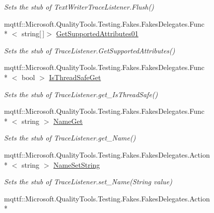 \begin{DoxyCompactItemize}
\begin{DoxyCompactList}\small\item\em Sets the stub of Text\-Writer\-Trace\-Listener.\-Flush()\end{DoxyCompactList}\item 
mqttf\-::\-Microsoft.\-Quality\-Tools.\-Testing.\-Fakes.\-Fakes\-Delegates.\-Func\\*
$<$ string\mbox{[}$\,$\mbox{]}$>$ \hyperlink{class_system_1_1_diagnostics_1_1_fakes_1_1_stub_xml_writer_trace_listener_a46c2a38f8b5dca50710cf2c2ad07886a}{Get\-Supported\-Attributes01}
\begin{DoxyCompactList}\small\item\em Sets the stub of Trace\-Listener.\-Get\-Supported\-Attributes()\end{DoxyCompactList}\item 
mqttf\-::\-Microsoft.\-Quality\-Tools.\-Testing.\-Fakes.\-Fakes\-Delegates.\-Func\\*
$<$ bool $>$ \hyperlink{class_system_1_1_diagnostics_1_1_fakes_1_1_stub_xml_writer_trace_listener_ae53f7ba7d41121ea3fb05afdf7184161}{Is\-Thread\-Safe\-Get}
\begin{DoxyCompactList}\small\item\em Sets the stub of Trace\-Listener.\-get\-\_\-\-Is\-Thread\-Safe()\end{DoxyCompactList}\item 
mqttf\-::\-Microsoft.\-Quality\-Tools.\-Testing.\-Fakes.\-Fakes\-Delegates.\-Func\\*
$<$ string $>$ \hyperlink{class_system_1_1_diagnostics_1_1_fakes_1_1_stub_xml_writer_trace_listener_a8d94c999b8414a0d2b3cf4c081e927bf}{Name\-Get}
\begin{DoxyCompactList}\small\item\em Sets the stub of Trace\-Listener.\-get\-\_\-\-Name()\end{DoxyCompactList}\item 
mqttf\-::\-Microsoft.\-Quality\-Tools.\-Testing.\-Fakes.\-Fakes\-Delegates.\-Action\\*
$<$ string $>$ \hyperlink{class_system_1_1_diagnostics_1_1_fakes_1_1_stub_xml_writer_trace_listener_a9d6b52ecf4fe51eea1b3575b8dfbf069}{Name\-Set\-String}
\begin{DoxyCompactList}\small\item\em Sets the stub of Trace\-Listener.\-set\-\_\-\-Name(\-String value)\end{DoxyCompactList}\item 
mqttf\-::\-Microsoft.\-Quality\-Tools.\-Testing.\-Fakes.\-Fakes\-Delegates.\-Action\\*

\end{DoxyCompactItemize}
